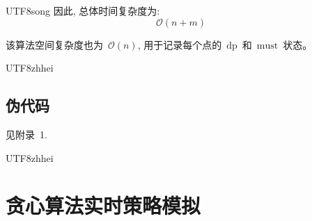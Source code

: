 \documentclass[10.5pt,compsoc]{CjC}
\theoremstyle{mystyle}
\begin{document}
\begin{CJK*}{UTF8}{song}
因此, 总体时间复杂度为: 
\[
\mathcal{O}(n + m)
\]

该算法空间复杂度也为~$\mathcal{O}(n)$,
用于记录每个点的~$\textrm{dp}$~和~$\textrm{must}$~状态。

\begin{CJK*}{UTF8}{zhhei}\subsection{伪代码}\end{CJK*}


见附录~1.

\end{CJK*}


\begin{CJK*}{UTF8}{zhhei}
\vskip 1mm
\section{贪心算法实时策略模拟}
\end{CJK*}
\end{document}
